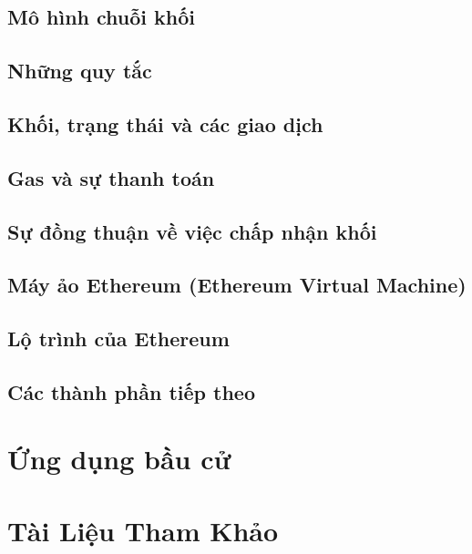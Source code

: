 \documentclass[12pt]{article}
\begin{document}
	\subsection{Mô hình chuỗi khối}
	

	\subsection{Những quy tắc}
	

	\subsection{Khối, trạng thái và các giao dịch}
	

	\subsection{Gas và sự thanh toán}
	

	\subsection{Sự đồng thuận về việc chấp nhận khối}
	

	\subsection{Máy ảo Ethereum (Ethereum Virtual Machine)}
	
	
	\subsection{Lộ trình của Ethereum}
	
	
	\subsection{Các thành phần tiếp theo}
	
	
	\section{Ứng dụng bầu cử}
	
	\section{Tài Liệu Tham Khảo}
	
\end{document}
